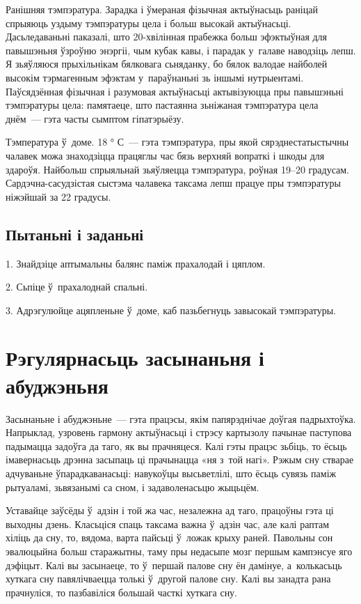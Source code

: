 Ранішняя тэмпэратура. Зарадка і ўмераная фізычная актыўнасьць раніцай спрыяюць уздыму тэмпэратуры цела і больш высокай актыўнасьці. Дасьледаваньні паказалі, што 20-хвілінная прабежка больш эфэктыўная для павышэньня ўзроўню энэргіі, чым кубак кавы, і парадак у~галаве наводзіць лепш. Я зьяўляюся прыхільнікам бялковага сьняданку, бо бялок валодае найболей высокім тэрмагенным эфэктам у~параўнаньні зь іншымі нутрыентамі. Паўсядзённая фізычная і разумовая актыўнасьці актывізуюцца пры павышэньні тэмпэратуры цела: памятаеце, што пастаянна зьніжаная тэмпэратура цела днём~--- гэта часты сымптом гіпатэрыёзу.

Тэмпература ў~доме. 18 ° С~--- гэта тэмпэратура, пры якой сярэднестатыстычны чалавек можа знаходзіцца працяглы час бязь верхняй вопраткі і шкоды для здароўя. Найбольш спрыяльнай зьяўляецца тэмпэратура, роўная 19--20 градусам. Сардэчна-сасудзістая сыстэма чалавека таксама лепш працуе пры тэмпэратуры ніжэйшай за 22 градусы.

\subsection*{Пытаньні і заданьні}

1. Знайдзіце аптымальны балянс паміж прахалодай і цяплом.

2. Сьпіце ў~прахалоднай спальні.

3. Адрэгулюйце ацяпленьне ў~доме, каб пазьбегнуць завысокай тэмпэратуры.


\section{Рэгулярнасьць засынаньня і абуджэньня}

Засынаньне і абуджэньне~--- гэта працэсы, якім папярэднічае доўгая падрыхтоўка. Напрыклад, узровень гармону актыўнасьці і стрэсу картызолу пачынае паступова падымацца задоўга да таго, як вы прачняцеся. Калі гэты працэс зьбіць, то ёсьць імавернасьць дрэнна засыпаць ці прачынацца «ня з~той нагі». Рэжым сну стварае адчуваньне ўпарадкаванасьці: навукоўцы высьветлілі, што ёсьць сувязь паміж рытуаламі, зьвязанымі са сном, і задаволенасьцю жыцьцём.

Уставайце заўсёды ў~адзін і той жа час, незалежна ад таго, працоўны гэта ці выходны дзень. Класьціся спаць таксама важна ў~адзін час, але калі раптам хіліць да сну, то, вядома, варта пайсьці ў~ложак крыху раней. Павольны сон эвалюцыйна больш старажытны, таму пры недасыпе мозг першым кампэнсуе яго дэфіцыт. Калі вы засынаеце, то ў~першай палове сну ён дамінуе, а~колькасьць хуткага сну павялічваецца толькі ў~другой палове сну. Калі вы занадта рана прачнуліся, то пазбавіліся большай часткі хуткага сну.

